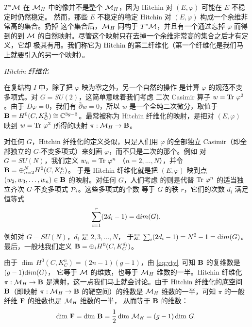 $T^*\M$ 在 $\MH$ 中的像并不是整个 $\MH$，因为 Hitchin 对 $(E,\varphi)$ 可能在 $E$ 不稳定时仍然稳定。
然而，那些 $E$ 不稳定的稳定 Hitchin 对 $(E,\varphi)$ 构成一个余维非常高的集合。扔掉
这个集合后，$\MH$ 同构于 $T^*\M$，并且有一个通过忘掉 $\varphi$ 而得到的到
$\M$ 的自然映射。尽管这个映射只在去掉一个余维非常高的集合之后才有定义，它却
极其有用。我们称它为 Hitchin 的第二纤维化（第一个纤维化是我们马上就要引入的另一个映射）。

\par\medskip\emph{Hitchin 纤维化}

在复结构 $I$ 中，除了把 $\varphi$ 映为零之外，另一个自然的操作
是计算 $\varphi$ 的规范不变多项式。对 $G=SU(2)$，这简单意味着我们考虑
二次 Casimir 算子 $w=\Tr\,\varphi^2$。由于
$\bar D\varphi=0$，我们有 $\bar\partial w=0$，所以 $w$ 是一个全纯二次微分，取值于
${\EUBB}=H^0(C,K_C^2)\cong \Bbb{C}^{3g-3}$。最常被称为 Hitchin 纤维化的映射，是把对 $(E,\varphi)$ 映到
$w=\Tr\,\varphi^2$ 所得的映射 $\pi:\MH\to {\EUBB}$。

对任何 $G$，Hitchin 纤维化的定义类似，只是人们用 $\varphi$ 的全部独立
Casimir（即全部独立的 $G$-不变多项式）来刻画 $\varphi$，而不只是二次的那个。例如
对 $G=SU(N)$，我们定义 $w_n=\Tr\,\varphi^n$
（$n=2,\dots,N$），并令 ${\EUBB}=\oplus_{n=2}^NH^0(C,K_C^n)$。
于是 Hitchin 纤维化就是把 $(E,\varphi)$ 映到点 $(w_2,w_3,\dots,w_n)\in {\EUBB}$ 的映射。对任何 $G$，人们考虑
的则是代替 $\Tr\,\varphi^n$ 的适当独立齐次 $G$-不变多项式 ${\cal P}_i$。这些多项式的个数
等于 $G$ 的秩 $r$，它们的次数 $d_i$ 满足恒等式 %
\setcounter{equation}{23}
\begin{equation}\label{eq:yty}
\sum_{i=1}^r(2d_i-1)={\rm
dim}(G).
\end{equation}
 例如对 $G=SU(N)$，$d_i$ 是 $2,3,\dots,N$，
于是 $\sum_i(2d_i-1)=N^2-1={\rm dim}(G)$。最后，一般地我们定义 ${\EUBB}=\oplus_i H^0(C,K_C^{d_i})$。

由于 $\dim \,H^0(C,K_C^n)=(2n-1)(g-1)$，由 \eqref{eq:yty}\
可知 ${\EUBB}$ 的复维数是 $(g-1){\rm dim}(G)$，
它等于 $\M$ 的维数，也等于
$\M_H$ 维数的一半。Hitchin 纤维化 $\pi:\MH\to {\EUBB}$ 是满射，这一点我们马上就会讨论。由于 Hitchin 纤维化的底空间
${\EUBB}$（即映射 $\pi:\MH\to {\EUBB}$ 的靶空间）的维数是 $\MH$ 维数的一半，可知 $\pi$ 的一般纤维 $\CMF$ 的维数也是 $\MH$ 维数的一半，
从而等于 ${\EUBB}$ 的维数：
\setcounter{equation}{24}
\begin{equation}\label{eq:yrof}
\dim\,\CMF=\dim\,{\EUBB}={1\over
2}\dim\,\MH=(g-1)\dim\,G.
\end{equation}

